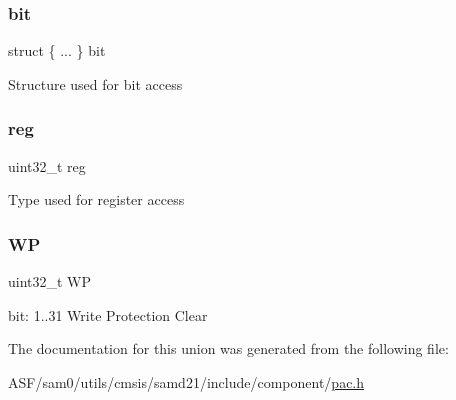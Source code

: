 \subsubsection{\texorpdfstring{bit}{bit}}
{\footnotesize\ttfamily struct \{ ... \}   bit}

Structure used for bit access \mbox{\label{union_p_a_c___w_p_c_l_r___type_a6b91636401516a477989a336376d7b40}} 
\subsubsection{\texorpdfstring{reg}{reg}}
{\footnotesize\ttfamily uint32\+\_\+t reg}

Type used for register access \mbox{\label{union_p_a_c___w_p_c_l_r___type_a086f0495fbde459e38572b5adcfae92b}} 
\subsubsection{\texorpdfstring{WP}{WP}}
{\footnotesize\ttfamily uint32\+\_\+t WP}

bit\+: 1..31 Write Protection Clear 

The documentation for this union was generated from the following file\+:\begin{DoxyCompactItemize}
\item 
A\+S\+F/sam0/utils/cmsis/samd21/include/component/\mbox{\hyperlink{pac_8h}{pac.\+h}}\end{DoxyCompactItemize}
